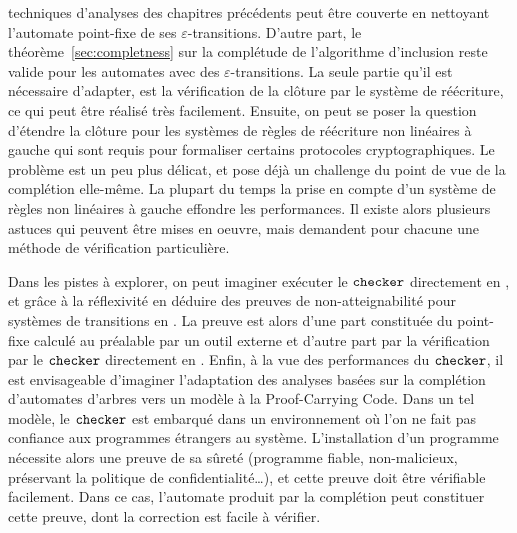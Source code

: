 techniques d'analyses des chapitres précédents peut être couverte en nettoyant l'automate
point-fixe de ses $\varepsilon$-transitions. %
D'autre part, le théorème~\ref{sec:completness} sur la complétude de l'algorithme
d'inclusion reste valide pour les automates avec des $\varepsilon$-transitions. La seule partie
qu'il est nécessaire d'adapter, est la vérification de la clôture par le système de réécriture,
ce qui peut être réalisé très facilement.
Ensuite, on peut se poser la question d'étendre la clôture pour les systèmes de règles
de réécriture non linéaires à gauche qui sont requis 
pour formaliser certains protocoles cryptographiques. Le problème est un peu plus délicat,
et pose déjà un challenge du point de vue de la complétion elle-même. La plupart du temps
la prise en compte d'un système de règles non linéaires à gauche effondre les performances.
Il existe alors plusieurs astuces qui peuvent être mises en oeuvre, mais
demandent pour chacune une méthode de vérification particulière.

Dans les pistes à explorer, on peut imaginer exécuter le
$\mathtt{checker}$ directement en \coq, et grâce à la réflexivité en
déduire des preuves de non-atteignabilité pour systèmes de transitions
en \coq. La preuve est alors d'une part constituée du point-fixe
calculé au préalable par un outil externe et d'autre part par la
vérification par le $\mathtt{checker}$ directement en \coq.
Enfin, à la vue des performances du
$\mathtt{checker}$, il est envisageable d'imaginer l'adaptation des
analyses basées sur la complétion d'automates d'arbres vers un modèle
à la Proof-Carrying Code.  Dans un tel modèle, le $\mathtt{checker}$ est
embarqué dans un environnement où l'on ne fait pas confiance aux
programmes étrangers au système. L'installation d'un programme
nécessite alors une preuve de sa sûreté (programme fiable,
non-malicieux, préservant la politique de confidentialité\dots), et
cette preuve doit être vérifiable facilement. Dans ce cas, l'automate
produit par la complétion peut constituer cette preuve, dont la
correction est facile à vérifier.


